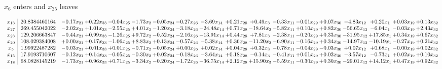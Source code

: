 \documentclass[9pt]{article}
\begin{document}
 $ x_{6} $ enters and $ x_{25} $ leaves 

 \[\begin{array}{c| c c@{\hskip 2pt} c@{\hskip 2pt} c@{\hskip 2pt} c@{\hskip 2pt} c@{\hskip 2pt} c@{\hskip 2pt} c@{\hskip 2pt} c@{\hskip 2pt} c@{\hskip 2pt} c@{\hskip 2pt} c@{\hskip 2pt} c@{\hskip 2pt} c@{\hskip 2pt} c@{\hskip 2pt} c@{\hskip 2pt} c@{\hskip 2pt} }
 x_{13}   &  20.8384460164 & -0.17 x_{21} & +  0.22 x_{33} & -0.04 x_{25} & -1.73 x_{2} & -0.05 x_{24} & -0.27 x_{26} & -3.69 x_{14} & +  0.21 x_{28} & +  0.49 x_{3} & -0.33 x_{11} & -0.01 x_{29} & +  0.07 x_{30} & -4.83 x_{12} & +  0.20 x_{1} & +  0.03 x_{19} & +  0.13 x_{32}\\
 x_{27}   &  269.455042022 & -2.02 x_{21} & +  1.01 x_{33} & -2.55 x_{25} & +  4.01 x_{2} & -1.20 x_{24} & -3.18 x_{26} & -24.48 x_{14} & +  0.71 x_{28} & -18.64 x_{3} & -5.82 x_{11} & +  0.10 x_{29} & +  0.82 x_{30} & -56.65 x_{12} & -6.04 x_{1} & -0.03 x_{19} & +  2.43 x_{32}\\
 x_{23}   &  129.206663847 & -0.44 x_{21} & +  0.99 x_{33} & -1.26 x_{25} & +  9.72 x_{2} & -0.52 x_{24} & -2.16 x_{26} & -13.91 x_{14} & +  0.44 x_{28} & +  7.81 x_{3} & -2.38 x_{11} & -0.20 x_{29} & +  0.33 x_{30} & -31.95 x_{12} & + 17.85 x_{1} & +  0.34 x_{19} & +  0.67 x_{32}\\
 x_{20}   &  108.029384008 & +  0.00 x_{21} & +  0.17 x_{33} & -1.06 x_{25} & +  8.83 x_{2} & +  0.13 x_{24} & -0.57 x_{26} & -5.38 x_{14} & +  0.36 x_{28} & -11.20 x_{3} & -6.90 x_{11} & -0.16 x_{29} & +  0.34 x_{30} & -14.97 x_{12} & -10.19 x_{1} & -0.27 x_{19} & +  0.21 x_{32}\\
 x_{5}   &  1.99922487282 & -0.03 x_{21} & +  0.01 x_{33} & +  0.01 x_{25} & -0.71 x_{2} & -0.05 x_{24} & +  0.00 x_{26} & +  0.02 x_{14} & +  0.04 x_{28} & +  0.32 x_{3} & -0.78 x_{11} & -0.04 x_{29} & -0.03 x_{30} & +  0.07 x_{12} & +  0.68 x_{1} & -0.00 x_{19} & +  0.02 x_{32}\\
 x_{15}   &  17.9193710607 & -0.12 x_{21} & +  0.14 x_{33} & -0.05 x_{25} & -0.30 x_{2} & +  0.02 x_{24} & -0.18 x_{26} & -3.64 x_{14} & +  0.18 x_{28} & -0.14 x_{3} & -0.41 x_{11} & +  0.01 x_{29} & +  0.02 x_{30} & -3.57 x_{12} & -0.73 x_{1} & +  0.02 x_{19} & +  0.10 x_{32}\\
 x_{18}   &  68.0828145219 & -1.73 x_{21} & +  0.96 x_{33} & +  0.71 x_{25} & -3.34 x_{2} & -0.20 x_{24} & -1.72 x_{26} & -36.75 x_{14} & +  2.12 x_{28} & + 15.90 x_{3} & -5.59 x_{11} & -0.30 x_{29} & +  0.30 x_{30} & -29.01 x_{12} & + 14.12 x_{1} & +  0.47 x_{19} & +  0.92 x_{32}\\

\end{array}\]
\end{document}
